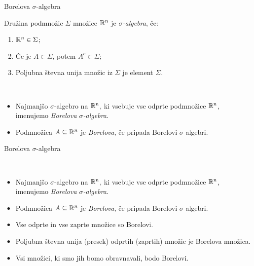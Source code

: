 \documentclass[10pt]{beamer}
\begin{document}
\begin{frame}{Borelova \(\sigma\)-algebra}
    \begin{definicija} 
        Družina podmnožic \(\Sigma\) množice \(\mathbb{R}^n\) je \emph{\(\sigma\)-algebra}, če:
        \begin{enumerate}
            \item \(\mathbb{R}^n \in \Sigma\);
            \item Če je \(A \in \Sigma\), potem \(A^c \in \Sigma\);
            \item Poljubna števna unija množic iz \(\Sigma\) je element \(\Sigma\).
        \end{enumerate} 
    \end{definicija}

    \pause

    \begin{definicija} \ 
        \begin{itemize}
            \item Najmanjšo \(\sigma\)-algebro na \(\mathbb{R}^n\), ki vsebuje vse odprte podmnožice \(\mathbb{R}^n\), imenujemo \emph{Borelova \(\sigma\)-algebra}.
            \item Podmnožica \(A \subseteq \mathbb{R}^n\) je \emph{Borelova}, če pripada Borelovi \(\sigma\)-algebri.
        \end{itemize}
    \end{definicija}
\end{frame}

\begin{frame}{Borelova \(\sigma\)-algebra}
    \begin{definicija} \ 
        \begin{itemize}
            \item Najmanjšo \(\sigma\)-algebro na \(\mathbb{R}^n\), ki vsebuje vse odprte podmnožice \(\mathbb{R}^n\), imenujemo \emph{Borelova \(\sigma\)-algebra}.
            \item Podmnožica \(A \subseteq \mathbb{R}^n\) je \emph{Borelova}, če pripada Borelovi \(\sigma\)-algebri.
        \end{itemize}
    \end{definicija}

    \begin{opomba}
        \begin{itemize}
            \item Vse odprte in vse zaprte množice so Borelovi.
            \item Poljubna števna unija (presek) odprtih (zaprtih) množic je Borelova množica. 
            \item Vsi množici, ki smo jih bomo obravnavali, bodo Borelovi.
        \end{itemize}
    \end{opomba}
\end{frame}
\end{document}
